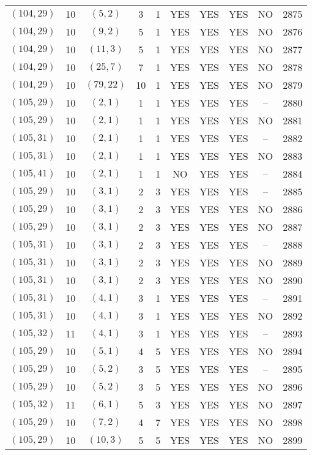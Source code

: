 \begin{longtable}{|c|c|c|c|c|c|c|c|c|c|}
$(104, 29)$ & 10 & $(5, 2)$ & 3 & 1 & YES & YES & YES & NO & 2875\\
$(104, 29)$ & 10 & $(9, 2)$ & 5 & 1 & YES & YES & YES & NO & 2876\\
$(104, 29)$ & 10 & $(11, 3)$ & 5 & 1 & YES & YES & YES & NO & 2877\\
$(104, 29)$ & 10 & $(25, 7)$ & 7 & 1 & YES & YES & YES & NO & 2878\\
$(104, 29)$ & 10 & $(79, 22)$ & 10 & 1 & YES & YES & YES & NO & 2879\\
$(105, 29)$ & 10 & $(2, 1)$ & 1 & 1 & YES & YES & YES & -- & 2880\\
$(105, 29)$ & 10 & $(2, 1)$ & 1 & 1 & YES & YES & YES & NO & 2881\\
$(105, 31)$ & 10 & $(2, 1)$ & 1 & 1 & YES & YES & YES & -- & 2882\\
$(105, 31)$ & 10 & $(2, 1)$ & 1 & 1 & YES & YES & YES & NO & 2883\\
$(105, 41)$ & 10 & $(2, 1)$ & 1 & 1 & NO & YES & YES & -- & 2884\\
$(105, 29)$ & 10 & $(3, 1)$ & 2 & 3 & YES & YES & YES & -- & 2885\\
$(105, 29)$ & 10 & $(3, 1)$ & 2 & 3 & YES & YES & YES & NO & 2886\\
$(105, 29)$ & 10 & $(3, 1)$ & 2 & 3 & YES & YES & YES & NO & 2887\\
$(105, 31)$ & 10 & $(3, 1)$ & 2 & 3 & YES & YES & YES & -- & 2888\\
$(105, 31)$ & 10 & $(3, 1)$ & 2 & 3 & YES & YES & YES & NO & 2889\\
$(105, 31)$ & 10 & $(3, 1)$ & 2 & 3 & YES & YES & YES & NO & 2890\\
$(105, 31)$ & 10 & $(4, 1)$ & 3 & 1 & YES & YES & YES & -- & 2891\\
$(105, 31)$ & 10 & $(4, 1)$ & 3 & 1 & YES & YES & YES & NO & 2892\\
$(105, 32)$ & 11 & $(4, 1)$ & 3 & 1 & YES & YES & YES & -- & 2893\\
$(105, 29)$ & 10 & $(5, 1)$ & 4 & 5 & YES & YES & YES & NO & 2894\\
$(105, 29)$ & 10 & $(5, 2)$ & 3 & 5 & YES & YES & YES & -- & 2895\\
$(105, 29)$ & 10 & $(5, 2)$ & 3 & 5 & YES & YES & YES & NO & 2896\\
$(105, 32)$ & 11 & $(6, 1)$ & 5 & 3 & YES & YES & YES & NO & 2897\\
$(105, 29)$ & 10 & $(7, 2)$ & 4 & 7 & YES & YES & YES & NO & 2898\\
$(105, 29)$ & 10 & $(10, 3)$ & 5 & 5 & YES & YES & YES & NO & 2899\\

\end{longtable}

